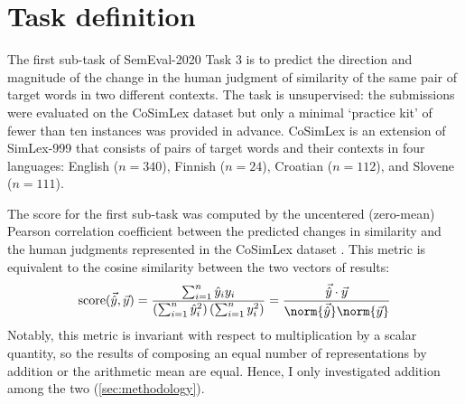 \section{Task definition}
\label{task-definition}

The first sub-task of SemEval-2020 Task 3 is to predict the direction and magnitude of
the change in the human judgment of similarity of the same pair of target words in two
different contexts.
The task is unsupervised: the submissions were evaluated on the CoSimLex dataset
\parencite[39-42]{Armendariz2020} but only a minimal `practice kit' of fewer than ten
instances was provided in advance.
CoSimLex is an extension of SimLex-999 \parencite{Hill2015} that consists of pairs of
target words and their contexts in four languages: English ($n = 340$), Finnish ($n =
  24$), Croatian ($n = 112$), and Slovene ($n = 111$).

The score for the first sub-task was computed by the uncentered (zero-mean) Pearson
correlation coefficient between the predicted changes in similarity and the human
judgments represented in the CoSimLex dataset \parencite[42]{Armendariz2020}.
This metric is equivalent to the cosine similarity between the two vectors of results:
\begin{equation}
  \text{score}(\vec{\hat{y}}, \vec{y})
  = \frac{\sum_{i = 1}^{n} \hat{y}_i y_i}{\left( \sum_{i = 1}^{n} \hat{y}_i^2 \right)\left( \sum_{i = 1}^{n} y_i^2 \right)}
  = \frac{\vec{\hat{y}} \cdot \vec{y}}{\norm{\vec{\hat{y}}} \norm{\vec{y}}}
\end{equation}
Notably, this metric is invariant with respect to multiplication by a scalar quantity,
so the results of composing an equal number of representations by addition or the
arithmetic mean are equal.
Hence, I only investigated addition among the two (\cref{sec:methodology}).
